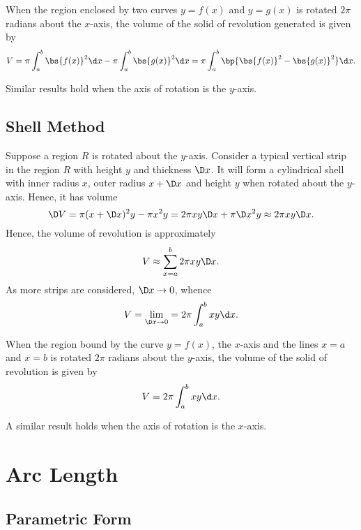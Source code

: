 \begin{proposition}
    When the region enclosed by two curves $y = f(x)$ and $y = g(x)$ is rotated $2\pi$ radians about the $x$-axis, the volume of the solid of revolution generated is given by \[V = \pi \int_a^b \bs{f(x)}^2 \d x - \pi \int_a^b \bs{g(x)}^2 \d x = \pi \int_a^b \bp{\bs{f(x)}^2 - \bs{g(x)}^2} \d x.\]
\end{proposition}

Similar results hold when the axis of rotation is the $y$-axis.

\subsection{Shell Method}

Suppose a region $R$ is rotated about the $y$-axis. Consider a typical vertical strip in the region $R$ with height $y$ and thickness $\D x$. It will form a cylindrical shell with inner radius $x$, outer radius $x + \D x$ and height $y$ when rotated about the $y$-axis. Hence, it has volume \[\D V = \pi (x + \D x)^2 y - \pi x^2 y = 2 \pi xy \D x + \pi \D x^2 y \approx 2 \pi xy \D x.\] Hence, the volume of revolution is approximately \[V \approx \sum_{x = a}^b 2 \pi xy \D x.\] As more strips are considered, $\D x \to 0$, whence \[V = \lim_{\D x \to 0} = 2\pi \int_a^b xy \d x.\]

\begin{proposition}
    When the region bound by the curve $y = f(x)$, the $x$-axis and the lines $x = a$ and $x = b$ is rotated $2\pi$ radians about the $y$-axis, the volume of the solid of revolution is given by \[V = 2\pi \int_a^b xy \d x.\]
\end{proposition}

A similar result holds when the axis of rotation is the $x$-axis.

\section{Arc Length}

\subsection{Parametric Form}

